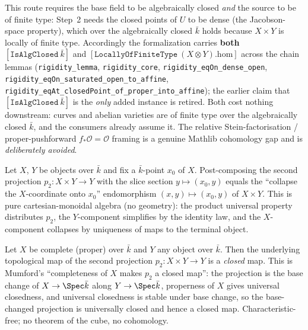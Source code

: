 \begin{remark}
  This route requires the base field to be algebraically closed \emph{and} the source to be of finite
  type: Step~2 needs the closed points of \(U\) to be dense (the Jacobson-space property), which over
  the algebraically closed \(\bar k\) holds because \(X \times Y\) is locally of finite type.
  Accordingly the formalization carries \textbf{both} \([\mathtt{IsAlgClosed}\ \bar k]\) and
  \([\mathtt{LocallyOfFiniteType}\ (X \otimes Y).\mathrm{hom}]\) across the chain lemmas
  (\texttt{rigidity\_lemma}, \texttt{rigidity\_core}, \texttt{rigidity\_eqOn\_dense\_open},
  \texttt{rigidity\_eqOn\_saturated\_open\_to\_affine},
  \texttt{rigidity\_eqAt\_closedPoint\_of\_proper\_into\_affine}); the earlier claim that
  \([\mathtt{IsAlgClosed}\ \bar k]\) is the \emph{only} added instance is retired. Both cost nothing
  downstream: curves and abelian varieties are of finite type over the algebraically closed \(\bar k\),
  and the consumers already assume it. The relative Stein-factorisation / proper-pushforward
  \(f_*\mathcal O = \mathcal O\) framing is a genuine Mathlib cohomology gap and is \emph{deliberately
  avoided}.
\end{remark}
\begin{lemma}
  \label{lem:rigidity_snd_lift}
  Let \(X\), \(Y\) be objects over \(\bar k\) and fix a \(\bar k\)-point \(x_0\) of \(X\).
  Post-composing the second projection \(p_2 \colon X \times Y \to Y\) with the slice section
  \(y \mapsto (x_0, y)\) equals the ``collapse the \(X\)-coordinate onto \(x_0\)'' endomorphism
  \((x, y) \mapsto (x_0, y)\) of \(X \times Y\). This is pure cartesian-monoidal algebra (no
  geometry): the product universal property distributes \(p_2\), the \(Y\)-component simplifies by
  the identity law, and the \(X\)-component collapses by uniqueness of maps to the terminal object.
\end{lemma}
\begin{lemma}
  \label{lem:snd_left_isClosedMap}
  Let \(X\) be complete (proper) over \(\bar k\) and \(Y\) any object over \(\bar k\). Then the
  underlying topological map of the second projection \(p_2 \colon X \times Y \to Y\) is a
  \emph{closed} map. This is Mumford's ``completeness of \(X\) makes \(p_2\) a closed map'': the
  projection is the base change of \(X \to \Spec \bar k\) along \(Y \to \Spec \bar k\), properness
  of \(X\) gives universal closedness, and universal closedness is stable under base change, so the
  base-changed projection is universally closed and hence a closed map. Characteristic-free; no
  theorem of the cube, no cohomology.
\end{lemma}
